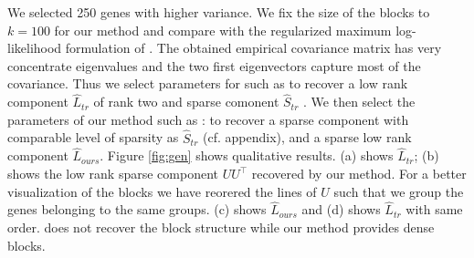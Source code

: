 We selected 250 genes with higher variance. We fix the size of the blocks to $k=100$ for our method and compare with the regularized maximum log-likelihood formulation of \citet{chandrasekaran2010}. The obtained empirical covariance matrix has very concentrate eigenvalues and the two first eigenvectors capture most of the covariance. Thus we select parameters for \citet{chandrasekaran2010} such as to recover a low rank component $\hat{L}_{tr}$ of rank two and sparse comonent $\hat{S}_{tr}$  . We then select the parameters of our method such as : to recover a sparse component with comparable level of sparsity as $\hat{S}_{tr}$ (cf. appendix), and a sparse low rank component  $\hat{L}_{ours}$. Figure \ref{fig:gen} shows qualitative results. (a) shows $\hat{L}_{tr}$; (b) shows the low rank sparse component $UU^{\top}$ recovered by our method. For a better visualization of the blocks we have reorered the lines of $U$ such that we group the genes belonging to the same groups. (c) shows $\hat{L}_{ours}$ and (d) shows $\hat{L}_{tr}$ with same order. \citet{chandrasekaran2010} does not recover the block structure while our method provides dense blocks.


